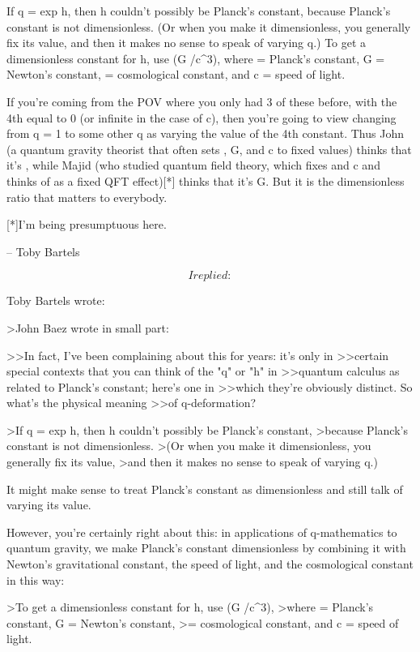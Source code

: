 If q = exp h, then h couldn't possibly be Planck's constant,
because Planck's constant is not dimensionless.
(Or when you make it dimensionless, you generally fix its value,
and then it makes no sense to speak of varying q.)
To get a dimensionless constant for h, use (\hbar  G \Lambda /c^3),
where \hbar  = Planck's constant, G = Newton's constant,
\Lambda  = cosmological constant, and c = speed of light.

If you're coming from the POV where you only had 3 of these before,
with the 4th equal to 0 (or infinite in the case of c),
then you're going to view changing from q = 1 to some other q
as varying the value of the 4th constant.
Thus John (a quantum gravity theorist that often sets
\hbar , G, and c to fixed values) thinks that it's \Lambda ,
while Majid (who studied quantum field theory, which fixes \hbar  and c
and thinks of \Lambda  as a fixed QFT effect)[*] thinks that it's G.
But it is the dimensionless ratio that matters to everybody.

[*]I'm being presumptuous here.

-- Toby Bartels


$$
    

I replied:

$$



Toby Bartels wrote:

>John Baez wrote in small part:

>>In fact, I've been complaining about this for years: it's only in
>>certain special contexts that you can think of the "q" or "h" in
>>quantum calculus as related to Planck's constant; here's one in
>>which they're obviously distinct.  So what's the physical meaning
>>of q-deformation?

>If q = exp h, then h couldn't possibly be Planck's constant,
>because Planck's constant is not dimensionless.
>(Or when you make it dimensionless, you generally fix its value,
>and then it makes no sense to speak of varying q.)

It might make sense to treat Planck's constant as dimensionless 
and still talk of varying its value.  

However, you're certainly right about this: in applications of 
q-mathematics to quantum gravity, we make Planck's constant 
dimensionless by combining it with Newton's gravitational 
constant, the speed of light, and the cosmological constant in this way:

>To get a dimensionless constant for h, use (\hbar  G \Lambda /c^3),
>where \hbar  = Planck's constant, G = Newton's constant,
>\Lambda  = cosmological constant, and c = speed of light.

